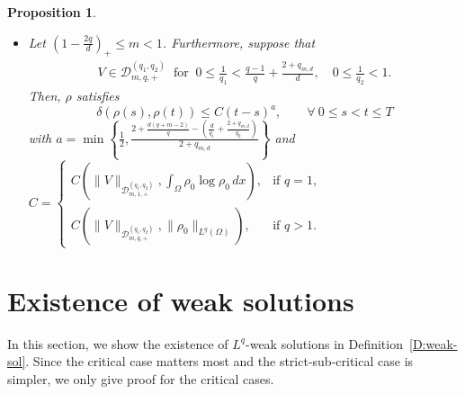 \documentclass{amsart}
\newtheorem{proposition}[defn]{Proposition}
\numberwithin{equation}{section}
\begin{document}
\begin{proposition}
\begin{itemize}
\begin{itemize}
\item[$\bullet$] Let $(1-\frac{2q}{d})_{+} \leq m <1$. Furthermore, suppose that 
\begin{equation*}\label{V:divfree:regular:delta}
\begin{gathered}
	V\in \mathcal{D}_{m,q,+}^{(q_1,q_2)} 
	\ \text{ for } \  0 \leq \frac{1}{q_1} < \frac{q-1}{q} + \frac{2+q_{m,d}}{d}, \quad  0 \leq \frac{1}{q_2} < 1.
\end{gathered}
\end{equation*}
Then, $\rho$  satisfies
    \begin{equation}\label{regular:narrow-distance:2}
	\delta(\rho(s),\rho(t))\leq C(t-s)^{a},  \qquad \forall~ 0\leq s<t\leq T
	\end{equation}
   with $a= \min \left\{ \frac{1}{2}, \frac{2+\frac{d(q+m-2)}{q} - \left(\frac{d}{q_1} + \frac{2+q_{m,d}}{q_2}\right)}{2+q_{m,d}} \right\}$ 
and $C= \begin{cases}
	C ( \|V\|_{\mathcal{D}_{m,1,+}^{(q_1,q_2)}}, \int_{\Omega} \rho_0 \log \rho_0 \,dx ), & \text{if } q=1 , \\
	C (\|V\|_{\mathcal{D}_{m,q,+}^{(q_1,q_2)}}, \|\rho_{0}\|_{L^{q} (\Omega)} ), &\text{if } q>1.
\end{cases}$
    \end{itemize}
    
    

\end{itemize}


\end{proposition}

\section{Existence of weak solutions}\label{Exist-weak}
In this section, we show the existence of $L^q$-weak solutions in Definition~\ref{D:weak-sol}. 
 Since the critical case matters most and the strict-sub-critical case is simpler, we only give proof for the critical cases.
 
\end{document}
